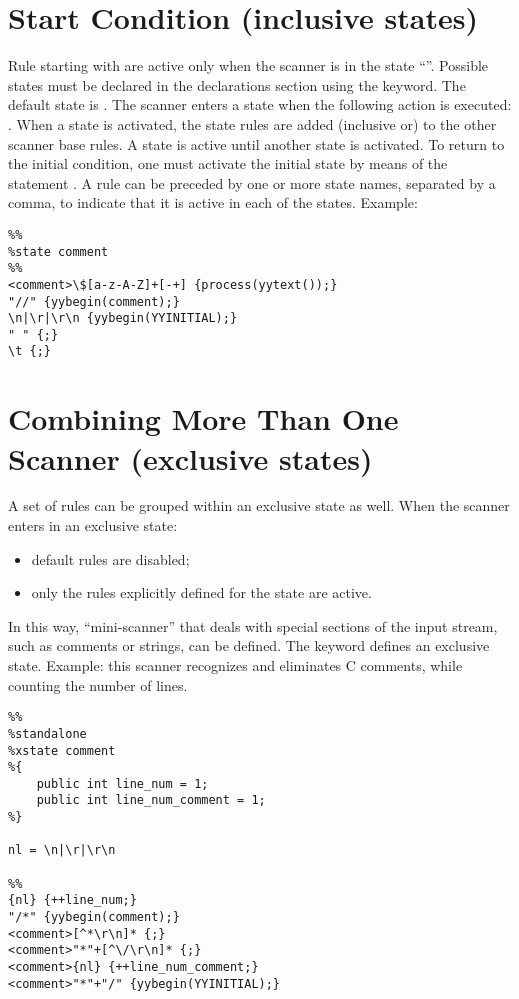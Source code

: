 \section{Start Condition (inclusive states)}
Rule starting with  are active only when the scanner is in the state ``''.
Possible states must be declared in the declarations section using the  keyword.
The default state is .
The scanner enters a state when the following action is executed: .
When a state is activated, the state rules are added (inclusive or) to the other scanner base rules.
A state is active until another state is activated.
To return to the initial condition, one must activate the initial state by means of the statement .
A rule can be preceded by one or more state names, separated by a comma, to indicate that it is active in each of the states.
Example:
\begin{lstlisting}
%%
%state comment
%%
<comment>\$[a-z-A-Z]+[-+] {process(yytext());}
"//" {yybegin(comment);}
\n|\r|\r\n {yybegin(YYINITIAL);}
" " {;}
\t {;}
\end{lstlisting}

\section{Combining More Than One Scanner (exclusive states)}
A set of rules can be grouped within an exclusive state as well.
When the scanner enters in an exclusive state:
\begin{itemize}
    \item default rules are disabled;
    \item only the rules explicitly defined for the state are active.
\end{itemize}
In this way, ``mini-scanner'' that deals with special sections of the input stream, such as comments or strings, can be defined.
The  keyword defines an exclusive state.
Example: this scanner recognizes and eliminates C comments, while counting the number of lines.
\begin{lstlisting}
%%
%standalone
%xstate comment
%{
    public int line_num = 1;
    public int line_num_comment = 1;
%}

nl = \n|\r|\r\n

%%
{nl} {++line_num;}
"/*" {yybegin(comment);}
<comment>[^*\r\n]* {;}
<comment>"*"+[^\/\r\n]* {;}
<comment>{nl} {++line_num_comment;}
<comment>"*"+"/" {yybegin(YYINITIAL);}
\end{lstlisting}

